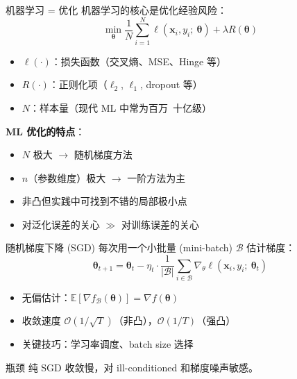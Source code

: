 \documentclass[11pt, aspectratio=169, svgnames, table, fontset=fandol]{ctexbeamer}
\newcommand{\E}{\mathbb{E}}
\begin{document}
\begin{frame}{机器学习 = 优化}
  机器学习的核心是优化经验风险：
  \begin{equation*}
    \min_{\bm{\theta}} \frac{1}{N} \sum_{i=1}^N \ell(\bm{x}_i, y_i;\ \bm{\theta}) + \lambda R(\bm{\theta})
  \end{equation*}

  \begin{itemize}
    \item $\ell(\cdot)$：损失函数（交叉熵、MSE、Hinge 等）
    \item $R(\cdot)$：正则化项（$\ell_2$, $\ell_1$, dropout 等）
    \item $N$：样本量（现代 ML 中常为百万~十亿级）
  \end{itemize}

  \vspace{6pt}
  \textbf{ML 优化的特点}：
  \begin{itemize}
    \item $N$ 极大 $\to$ 随机梯度方法
    \item $n$（参数维度）极大 $\to$ 一阶方法为主
    \item 非凸但实践中可找到不错的局部极小点
    \item 对泛化误差的关心 $\gg$ 对训练误差的关心
  \end{itemize}
\end{frame}

\begin{frame}{随机梯度下降 (SGD)}
  每次用一个小批量 (mini-batch) $\mathcal{B}$ 估计梯度：
  \begin{equation*}
    \bm{\theta}_{t+1} = \bm{\theta}_t - \eta_t \cdot \frac{1}{|\mathcal{B}|} \sum_{i \in \mathcal{B}} \nabla_\theta \ell(\bm{x}_i, y_i;\ \bm{\theta}_t)
  \end{equation*}

  \begin{itemize}
    \item 无偏估计：$\E[\nabla f_{\mathcal{B}}(\bm{\theta})] = \nabla f(\bm{\theta})$
    \item 收敛速度 $\mathcal{O}(1/\sqrt{T})$（非凸），$\mathcal{O}(1/T)$（强凸）
    \item 关键技巧：学习率调度、batch size 选择
  \end{itemize}

  \begin{alertblock}{瓶颈}
    纯 SGD 收敛慢，对 ill-conditioned 和梯度噪声敏感。
  \end{alertblock}
\end{frame}
\end{document}
